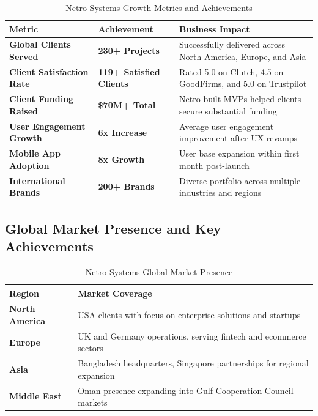 \documentclass[12pt,a4paper]{report}
\newcommand{\tableheaderrow}{\rowcolor{tableheader}}
\newcommand{\tablealtrow}{\rowcolor{tablealt1}}
\newcommand{\impact}[1]{\textcolor{impactcolor}{\textbf{#1}}}
\begin{document}
\begin{table}[h!]
\centering
\caption{Netro Systems Growth Metrics and Achievements}
\label{tab:growth_metrics}
\begin{tabular}{p{6cm} p{3cm} p{6cm}}
\toprule
\rowcolor{tableheader}\textcolor{headertext}{\textbf{Metric}} & \textcolor{headertext}{\textbf{Achievement}} & \textcolor{headertext}{\textbf{Business Impact}} \\
\midrule
\tablealtrow \impact{Global Clients Served} & \textbf{230+ Projects} & Successfully delivered across North America, Europe, and Asia \\
\impact{Client Satisfaction Rate} & \textbf{119+ Satisfied Clients} & Rated 5.0 on Clutch, 4.5 on GoodFirms, and 5.0 on Trustpilot \\
\tablealtrow \impact{Client Funding Raised} & \textbf{\$70M+ Total} & Netro-built MVPs helped clients secure substantial funding \\
\impact{User Engagement Growth} & \textbf{6x Increase} & Average user engagement improvement after UX revamps \\
\tablealtrow \impact{Mobile App Adoption} & \textbf{8x Growth} & User base expansion within first month post-launch \\
\impact{International Brands} & \textbf{200+ Brands} & Diverse portfolio across multiple industries and regions \\
\bottomrule
\end{tabular}
\end{table}

\newpage
\subsection{Global Market Presence and Key Achievements}

\begin{table}[h!]
\centering
\caption{Netro Systems Global Market Presence}
\label{tab:global_presence}
\begin{tabular}{p{6cm} p{8cm}}
\toprule
\tableheaderrow \textcolor{headertext}{\textbf{Region}} & \textcolor{headertext}{\textbf{Market Coverage}} \\
\midrule
\tablealtrow \impact{North America} & USA clients with focus on enterprise solutions and startups \\
\impact{Europe} & UK and Germany operations, serving fintech and ecommerce sectors \\
\tablealtrow \impact{Asia} & Bangladesh headquarters, Singapore partnerships for regional expansion \\
\impact{Middle East} & Oman presence expanding into Gulf Cooperation Council markets \\
\bottomrule
\end{tabular}
\end{table}
\end{document}
